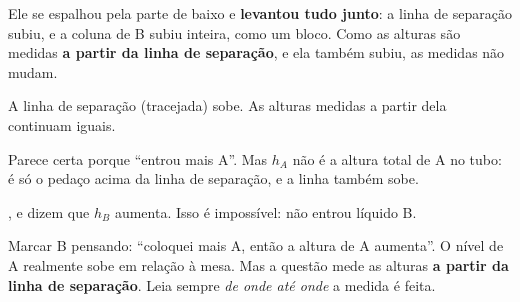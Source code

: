 Ele se espalhou pela parte de baixo e \textbf{levantou tudo junto}: a linha de separação subiu, e a coluna de B subiu inteira,
como um bloco. Como as alturas são medidas \textbf{a partir da linha de separação}, e ela também subiu, as medidas não mudam.

\begin{center}
\newcommand{\tuboU}[2]{%
  \begin{scope}
    \pgfmathsetmacro{\s}{#1}
    \fill[corA!55] (0,0.0) rectangle (3.0,0.7);                      %
    \fill[corA!55] (0,0.7) rectangle (0.7,\s+1.2);                   %
    \fill[corA!55] (2.3,0.7) rectangle (3.0,\s);                     %
    \fill[yellow!70!orange] (2.3,\s) rectangle (3.0,\s+1.8);         %
    \draw[fio] (0,4.7) -- (0,0) -- (3.0,0) -- (3.0,4.7);
    \draw[fio] (0.7,4.7) -- (0.7,0.7) -- (2.3,0.7) -- (2.3,4.7);
    \draw[dashed,line width=0.7pt] (-0.5,\s) -- (3.5,\s);
    \draw[cota] (-0.3,\s) -- (-0.3,\s+1.2) node[midway,left]{$h_A$};
    \draw[cota] (3.3,\s) -- (3.3,\s+1.8) node[midway,right]{$h_B$};
    \node[white,font=\bfseries] at (0.35,1.2) {A};
    \node[font=\bfseries] at (2.65,\s+0.9) {B};
    \node[below,font=\small\bfseries] at (1.5,-0.1) {#2};
  \end{scope}}

{\footnotesize\color{cinza}A linha de separação (tracejada) sobe. As alturas medidas a partir dela continuam iguais.}
\end{center}


\begin{outras}
 Parece certa porque ``entrou mais A''. Mas $h_A$ não é a altura total de A no tubo: é só o pedaço acima da linha de separação, e a linha também sobe.\par
{},  e  dizem que $h_B$ aumenta. Isso é impossível: não entrou líquido B.
\end{outras}

\begin{pegadinha}
Marcar B pensando: ``coloquei mais A, então a altura de A aumenta''. O nível de A realmente sobe em relação à mesa.
Mas a questão mede as alturas \textbf{a partir da linha de separação}. Leia sempre \emph{de onde até onde} a medida é feita.
\end{pegadinha}
